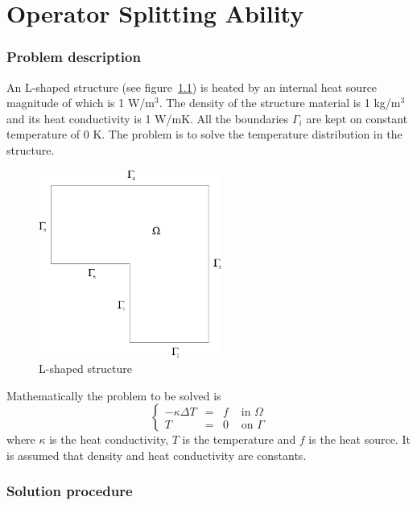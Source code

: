 \chapter{Operator Splitting Ability}


\subsection*{Problem description}

An L-shaped structure (see figure~\ref{fg:struct1}) is heated by an internal 
heat source magnitude of which is 1 W/m$^3$. The density of the structure 
material is 1 kg/m$^3$ and its heat conductivity is 1 W/mK. All the 
boundaries $\Gamma_i$ are kept on constant temperature of 0 K. The problem is 
to solve the temperature distribution in the structure.

\begin{figure}
\begin{center}
\includegraphics[width=60mm]{Area1}
\caption{L-shaped structure}\label{fg:struct1}
\end{center}
\end{figure}

Mathematically the problem to be solved is
\begin{equation}
\left \{
\begin{array}{cccc}
- \kappa \Delta T &= &f & \mbox{ in } \Omega \\
T&=&0 & \mbox{ on } \Gamma
\end{array}
\right .
\end{equation}
where $\kappa$ is the heat conductivity, $T$  is the temperature 
and $f$ is the heat source. It is assumed that density 
and heat conductivity are constants. 

\subsection*{Solution procedure}

